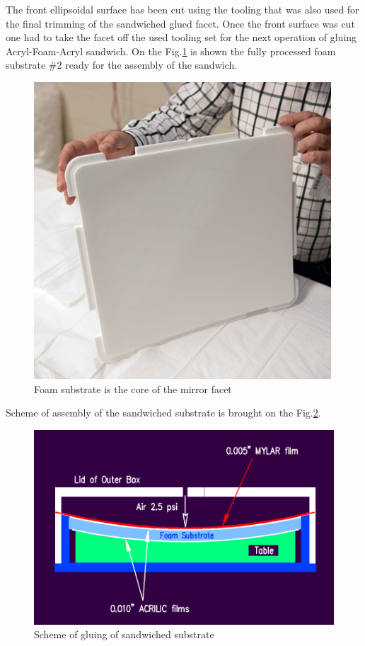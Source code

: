 The front ellipsoidal surface has been cut using the tooling that was also used for the final trimming of the sandwiched glued facet. Once the front surface was cut one had to take the facet off the used tooling set for the next operation of gluing Acryl-Foam-Acryl sandwich. On the Fig.\ref{fig:Foam_Sub} is shown the fully processed foam substrate \#2 ready for the assembly of the sandwich. 

\begin{figure}[h]
    \centering
    \includegraphics[width=0.9\linewidth]{images/Foam_Sub.png}
    \caption{Foam substrate is the core of the mirror facet}
    \label{fig:Foam_Sub}
\end{figure}

Scheme of assembly of the sandwiched substrate is brought on the Fig.\ref{fig:Gluing_Sandwich}.

\begin{figure}[h]
    \centering
    \includegraphics[width=0.9\linewidth]{images/Gluing_Sandwich_New.png}
    \caption{Scheme of gluing of sandwiched substrate}
    \label{fig:Gluing_Sandwich}
\end{figure}


